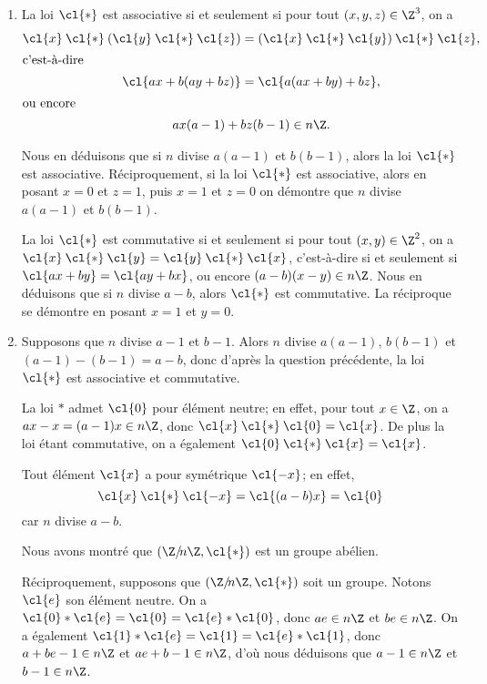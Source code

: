 \begin{enumerate}
\item %
    La loi $\cl{*}$ est associative si et seulement si pour tout $(x,y,z)\in\Z^3$, on a
    \begin{gather*}
        \cl{x}\mathbin{\cl{*}}(\cl{y}\mathbin{\cl{*}}\cl{z}) = (\cl{x}\mathbin{\cl{*}}\cl{y})\mathbin{\cl{*}}\cl{z}, \\
      \intertext{c'est-à-dire}
      \cl{ax+b(ay+bz)} = \cl{a(ax+by)+bz}, \\
      \intertext{ou encore}
      ax(a-1) + bz(b-1) \in n\Z.
    \end{gather*}

    Nous en déduisons que si $n$ divise $a(a - 1)$ et $b(b - 1)$, alors la loi $\cl{*}$ est associative.
    Réciproquement, si la loi $\cl{*}$ est associative, alors en posant  $x = 0$ et $z = 1$, puis $x = 1$ et $z = 0$ on démontre que $n$ divise $a(a - 1)$ et $b(b - 1)$.

    La loi $\cl{*}$ est commutative si et seulement si pour tout $(x,y)\in\Z^2$, on a $\cl{x}\mathbin{\cl{*}}\cl{y} = \cl{y}\mathbin{\cl{*}}\cl{x}$, c'est-à-dire si et seulement si $\cl{ax + by} = \cl{ay + bx}$, ou encore $(a-b)(x-y)\in n\Z$.
    Nous en déduisons que si $n$ divise $a - b$, alors  $\cl{*}$ est commutative.
    La réciproque se démontre en posant $x = 1$ et $y = 0$.

  \item %
    Supposons que $n$ divise $a - 1$ et $b - 1$.
    Alors $n$ divise $a(a - 1)$, $b(b -1)$ et $(a - 1) - (b - 1) = a - b$, donc d'après la question précédente, la loi $\cl{*}$ est associative et commutative.

    La loi $*$ admet $\cl{0}$ pour élément neutre; en effet, pour tout $x\in\Z$, on a $ax - x = (a - 1)x \in n\Z$, donc $\cl{x}\mathbin{\cl{*}}\cl{0} = \cl{x}$.
    De plus la loi étant commutative, on a également $\cl{0}\mathbin{\cl{*}}\cl{x} = \cl{x}$.

    Tout élément $\cl{x}$ a pour symétrique $\cl{-x}$; en effet,
    \[
      \cl{x}\mathbin{\cl{*}}\cl{-x} = \cl{(a - b)x} = \cl{0}
    \]
    car $n$ divise $a - b$.

    Nous avons montré que $(\Z/\!n\Z,\cl{*})$ est un groupe abélien.

    Réciproquement, supposons que $(\Z/\!n\Z,\cl{*})$ soit un groupe.
    Notons $\cl{e}$ son élément neutre.
    On a $\cl{0}\mathbin{*}\cl{e} = \cl{0} = \cl{e}\mathbin{*}\cl{0}$, donc $ae\in n\Z$ et $be\in n\Z$.
    On a également $\cl{1}\mathbin{*}\cl{e} = \cl{1} = \cl{e}\mathbin{*}\cl{1}$, donc $a + be - 1\in n\Z$ et $ae + b - 1\in n\Z$, d'où nous déduisons que $a - 1\in n\Z$ et $b - 1\in n\Z$.


\end{enumerate}
